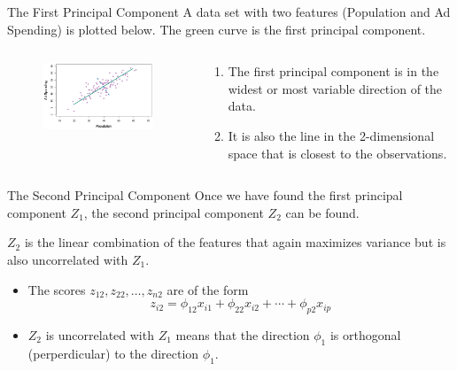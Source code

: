 \documentclass[
  ignorenonframetext,
  aspectratio=169,
]{beamer}
\begin{document}
\begin{frame}{The First Principal Component}
\protect\hypertarget{the-first-principal-component-3}{}
A data set with two features (Population and Ad Spending) is plotted
below. The green curve is the first principal component.

\begin{columns}[T]
\begin{column}{0.6\textwidth}
\begin{figure}

{\centering \includegraphics[width=3.33333in,height=\textheight]{images/first_component.png}

}

\end{figure}
\end{column}

\begin{column}{0.4\textwidth}
\begin{enumerate}
\item
  The first principal component is in the widest or most variable
  direction of the data.
\item
  It is also the line in the 2-dimensional space that is closest to the
  observations.
\end{enumerate}
\end{column}
\end{columns}
\end{frame}

\begin{frame}{The Second Principal Component}
\protect\hypertarget{the-second-principal-component}{}
Once we have found the first principal component \(Z_1\), the second
principal component \(Z_2\) can be found.

\alert{$Z_2$ is the linear combination of the features that again maximizes variance but is also uncorrelated with $Z_1$}.

\begin{itemize}
\item
  The scores \(z_{12}, z_{22}, \ldots, z_{n 2}\) are of the form
  \[z_{i 2}=\phi_{12} x_{i 1}+\phi_{22} x_{i 2}+\cdots+\phi_{p 2} x_{i p}\]
\item
  \(Z_2\) is uncorrelated with \(Z_1\) means that the direction
  \(\phi_1\) is orthogonal (perperdicular) to the direction \(\phi_1\).
\end{itemize}
\end{frame}
\end{document}
